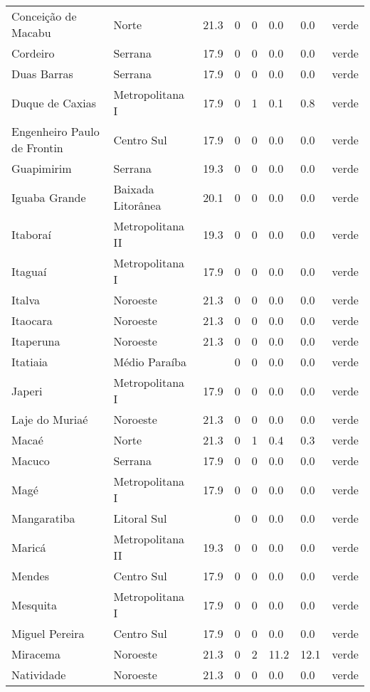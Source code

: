 \begin{longtable}{l|lllllll}
  Conceição de Macabu & Norte & 21.3 & 0 & 0 & 0.0 & 0.0 & verde \\ 
  Cordeiro & Serrana & 17.9 & 0 & 0 & 0.0 & 0.0 & verde \\ 
  Duas Barras & Serrana & 17.9 & 0 & 0 & 0.0 & 0.0 & verde \\ 
  Duque de Caxias & Metropolitana I & 17.9 & 0 & 1 & 0.1 & 0.8 & verde \\ 
  Engenheiro Paulo de Frontin & Centro Sul & 17.9 & 0 & 0 & 0.0 & 0.0 & verde \\ 
  Guapimirim & Serrana & 19.3 & 0 & 0 & 0.0 & 0.0 & verde \\ 
  Iguaba Grande & Baixada Litorânea & 20.1 & 0 & 0 & 0.0 & 0.0 & verde \\ 
  Itaboraí & Metropolitana II & 19.3 & 0 & 0 & 0.0 & 0.0 & verde \\ 
  Itaguaí & Metropolitana I & 17.9 & 0 & 0 & 0.0 & 0.0 & verde \\ 
  Italva & Noroeste & 21.3 & 0 & 0 & 0.0 & 0.0 & verde \\ 
  Itaocara & Noroeste & 21.3 & 0 & 0 & 0.0 & 0.0 & verde \\ 
  Itaperuna & Noroeste & 21.3 & 0 & 0 & 0.0 & 0.0 & verde \\ 
  Itatiaia & Médio Paraíba &  & 0 & 0 & 0.0 & 0.0 & verde \\ 
  Japeri & Metropolitana I & 17.9 & 0 & 0 & 0.0 & 0.0 & verde \\ 
  Laje do Muriaé & Noroeste & 21.3 & 0 & 0 & 0.0 & 0.0 & verde \\ 
  Macaé & Norte & 21.3 & 0 & 1 & 0.4 & 0.3 & verde \\ 
  Macuco & Serrana & 17.9 & 0 & 0 & 0.0 & 0.0 & verde \\ 
  Magé & Metropolitana I & 17.9 & 0 & 0 & 0.0 & 0.0 & verde \\ 
  Mangaratiba & Litoral Sul &  & 0 & 0 & 0.0 & 0.0 & verde \\ 
  Maricá & Metropolitana II & 19.3 & 0 & 0 & 0.0 & 0.0 & verde \\ 
  Mendes & Centro Sul & 17.9 & 0 & 0 & 0.0 & 0.0 & verde \\ 
  Mesquita & Metropolitana I & 17.9 & 0 & 0 & 0.0 & 0.0 & verde \\ 
  Miguel Pereira & Centro Sul & 17.9 & 0 & 0 & 0.0 & 0.0 & verde \\ 
  Miracema & Noroeste & 21.3 & 0 & 2 & 11.2 & 12.1 & verde \\ 
  Natividade & Noroeste & 21.3 & 0 & 0 & 0.0 & 0.0 & verde \\ 

\end{longtable}
